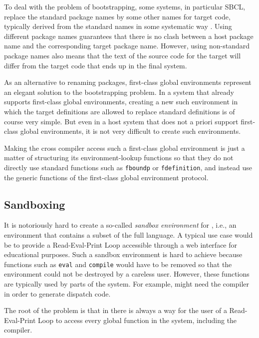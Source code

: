 To deal with the problem of bootstrapping, some systems, in particular
SBCL, replace the standard package names by some other names for
target code, typically derived from the standard names in some
systematic way \cite{Rhodes:2008:SSC:1482373.1482380}.  Using
different package names guarantees that there is no clash between a
host package name and the corresponding target package name.  However,
using non-standard package names also means that the text of the
source code for the target will differ from the target code that ends
up in the final system.

As an alternative to renaming packages, first-class global
environments represent an elegant solution to the bootstrapping
problem.  In a system that already supports first-class global
environments, creating a new such environment in which the target
definitions are allowed to replace standard \commonlisp{} definitions
is of course very simple.  But even in a host system that does not a
priori support first-class global environments, it is not very
difficult to create such environments.

Making the cross compiler access such a first-class global environment
is just a matter of structuring its environment-lookup functions so
that they do not directly use standard \commonlisp{} functions such as
\texttt{fboundp} or \texttt{fdefinition}, and instead use the generic
functions of the first-class global environment protocol.

\subsection{Sandboxing}

It is notoriously hard to create a so-called \emph{sandbox
  environment} for \commonlisp{}, i.e., an environment that contains
a subset of the full language.  A typical use case would be to
provide a Read-Eval-Print Loop accessible through a web interface for
educational purposes.  Such a sandbox environment is hard to achieve
because functions such as \texttt{eval} and \texttt{compile} would
have to be removed so that the environment could not be destroyed by a
careless user.  However, these functions are typically used by parts
of the system.  For example, \clos{} might need the compiler in order
to generate dispatch code.

The root of the problem is that in \commonlisp{} there is always a way
for the user of a Read-Eval-Print Loop to access every global function
in the system, including the compiler.


